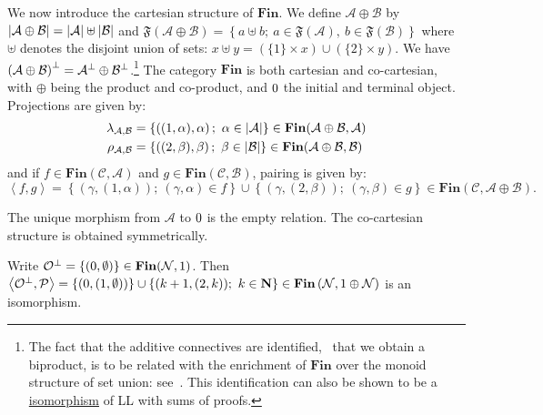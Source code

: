 We now introduce the cartesian structure of \(\mathbf{Fin}\). We define
\({\mathcal A} \oplus {\mathcal B}\) by
\(\left|{\mathcal A} \oplus {\mathcal B}\right| = \left|\mathcal A\right| \uplus \left|\mathcal B\right|\)
and
\(\mathfrak F\left({\mathcal A} \oplus {\mathcal B}\right) = \left\{ a\uplus b;\  a\in \mathfrak F\left(\mathcal A\right),\ b\in\mathfrak F\left(\mathcal B\right)\right\}\)
where \(\uplus\) denotes the disjoint union of sets:
\(x\uplus y=(\{1\}\times x)\cup(\{2\}\times y)\). We have
\(\left({\mathcal A}\oplus {\mathcal B}\right)^\bot = {\mathcal A}^\bot\oplus{\mathcal B}^\bot\).\footnote{The
  fact that the additive connectives are identified, \ie\ that we obtain
  a biproduct, is to be related with the enrichment of \(\mathbf{Fin}\)
  over the monoid structure of set union: see~\cite{differentialstructurebiadditive}. This identification can
  also be shown to be a \hyperref[isomorphism]{isomorphism} of LL with sums of proofs.}
The category \(\mathbf{Fin}\) is both cartesian and co-cartesian, with
\(\oplus\) being the product and co-product, and \(0\) the initial
and terminal object. Projections are given by:
\begin{align*}
\lambda_{{\mathcal A},{\mathcal B}}&=\left\{\left((1,\alpha),\alpha\right);\ \alpha\in\left|\mathcal A\right|\right\}
\in\mathbf{Fin}({\mathcal A}\oplus{\mathcal B},{\mathcal A}) \\
\rho_{{\mathcal A},{\mathcal B}}&=\left\{\left((2,\beta),\beta\right);\ \beta\in\left|\mathcal B\right|\right\}
\in\mathbf{Fin}({\mathcal A}\oplus{\mathcal B},{\mathcal B}) 
\end{align*}
and if \(f\in\mathbf{Fin}({\mathcal C},{\mathcal A})\) and
\(g\in\mathbf{Fin}({\mathcal C},{\mathcal B})\), pairing is given by:
\begin{equation*}
\left\langle f,g\right\rangle = \left\{\left(\gamma,(1,\alpha)\right);\ (\gamma,\alpha)\in f\right\} \cup \left\{\left(\gamma,(2,\beta)\right);\ (\gamma,\beta)\in g\right\} \in\mathbf{Fin}({\mathcal C},{\mathcal A}\oplus{\mathcal B}).
\end{equation*}

The unique morphism from \({\mathcal A}\) to \(0\) is the empty
relation. The co-cartesian structure is obtained symmetrically.

\begin{example}\label{example.-2}
Write \({\mathcal O}^\bot=\left\{(0,\emptyset)\right\}\in\mathbf{Fin}({\mathcal N},1)\). Then \(\left\langle{{\mathcal O}^\bot},{\mathcal{P}}\right\rangle =\{ (0,(1,\emptyset)) \}\cup \{ (k+1,(2,k)) ;\  k\in{\mathbf N} \} \in\mathbf{Fin}\left({\mathcal N},1\oplus{\mathcal N}\right)\) is an isomorphism.
\end{example}

